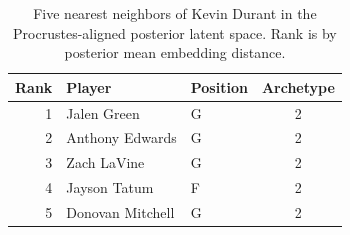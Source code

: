 \begin{table}[htbp]
  \centering\small
  \begin{tabular}{rllc}
    \toprule
    Rank & Player & Position & Archetype \\
    \midrule
    1 & Jalen Green & G & 2 \\
    2 & Anthony Edwards & G & 2 \\
    3 & Zach LaVine & G & 2 \\
    4 & Jayson Tatum & F & 2 \\
    5 & Donovan Mitchell & G & 2 \\
    \bottomrule
  \end{tabular}
  \caption{Five nearest neighbors of Kevin Durant in the Procrustes-aligned posterior latent space. Rank is by posterior mean embedding distance.}
  \label{tab:Kevin_Durant_neighbors}
\end{table}

